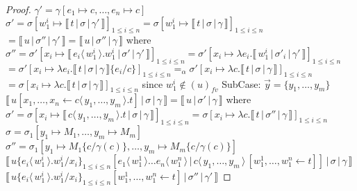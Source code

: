 \documentclass[a4paper,UKenglish,cleveref, autoref]{lipics-v2019}
\newcommand{\fv}[1]{(#1)_{fv}}
\newcommand{\set}[1]{ \{ #1 \} }
\newcommand{\abs}[2]{\lambda #1 . #2}
\newcommand{\fake}[3]{#1 \langle \, #2 \, \rangle . #3}
\newcommand{\share}[3]{#1 [#2 \leftarrow #3]}
\newcommand{\dist}[5]{#1 [ #2 \, \vert \, \fakedist{#4}{#5} \, #3 ]}
\newcommand{\fakedist}[2]{#1 \langle \, #2 \, \rangle}
\newcommand{\sub}[3]{#1 \{ #2 / #3 \}}
\newcommand{\readbackwmap}[3]{\llbracket \, #1 \, \vert \, #2 \, \vert \, #3  \, \rrbracket }
\begin{document}
\begin{proof}
$\gamma' = \gamma [e_{1}  \mapsto c, \dots, e_{n} \mapsto c]$
\newline
$\sigma' = \sigma [w^{i}_{1} \mapsto \readbackwmap{t}{\sigma}{\gamma'}]_{1 \leq i \leq n} = \sigma [w^{i}_{1} \mapsto \readbackwmap{t}{\sigma}{\gamma}]_{1 \leq i \leq n}$
\newline
$= \readbackwmap{u}{\sigma''}{\gamma'} = \readbackwmap{u}{\sigma''}{\gamma}$
\newline
where
\newline
$\sigma'' = \sigma' [x_{i} \mapsto \readbackwmap{\fake{e_{i}}{w^{i}_{1}}{w^{i}_{1}}}{\sigma'}{\gamma'}]_{1 \leq i \leq n} = \sigma' [x_{i} \mapsto \abs{e_{i}}{\readbackwmap{w^{i}_{1}}{\sigma'_{i}}{\gamma'}}]_{1 \leq i \leq n}$
\newline
\indent $= \sigma' [x_{i} \mapsto \abs{e_{i}}{\readbackwmap{t}{\sigma}{\gamma} \sub{}{e_{i}}{c}}]_{1 \leq i \leq n} =_{\alpha} \sigma' [x_{i} \mapsto \abs{c}{\readbackwmap{t}{\sigma}{\gamma}}]_{1 \leq i \leq n}$
\newline
\indent $=  \sigma [x_{i} \mapsto \abs{c}{\readbackwmap{t}{\sigma}{\gamma}}]_{1 \leq i \leq n}$ since $w^{i}_{1} \not\in \fv{u}$
\newline
\newline
SubCase: $\vec{y} = \set{y_{1}, \dots, y_{m}}$
\newline
$\readbackwmap{\share{u}{x_{1}, \dots, x_{n}}{\fake{c}{y_{1}, \dots, y_{m}}{t}}}{\sigma}{\gamma} = \readbackwmap{u}{\sigma'}{\gamma}$
\newline
where 
\newline
$\sigma' = \sigma [x_{i} \mapsto \readbackwmap{\fake{c}{y_{1}, \dots, y_{m}}{t}}{\sigma}{\gamma}]_{1 \leq i \leq n} = \sigma [x_{i} \mapsto \abs{c}{\readbackwmap{t}{\sigma''}{\gamma}}]_{1 \leq i \leq n}$
\newline
$\sigma = \sigma_{1} [y_{1} \mapsto M_{1} , \dots , y_{m} \mapsto M_{m} ]$
\newline
$\sigma'' = \sigma_{1}[ y_{1} \mapsto M_{1} \sub{}{c}{\gamma(c)} , \dots , y_{m} \mapsto M_{m} \sub{}{c}{\gamma(c)}]$
\newline
\newline
$\readbackwmap{\sub{u}{\fake{e_{i}}{w^{i}_{1}}{w^{i}_{1}}}{x_{i}}_{1 \leq i \leq n} \dist{}{\fakedist{e_{1}}{w^{1}_{1}} \dots \fakedist{e_{n}}{w^{n}_{1}}}{\share{}{w^{1}_{1}, \dots, w^{n}_{1}}{t}}{c}{y_{1}, \dots, y_{m}}}{\sigma}{\gamma}$
\newline
$\readbackwmap{\sub{u}{\fake{e_{i}}{w^{i}_{1}}{w^{i}_{1}}}{x_{i}}_{1 \leq i \leq n} \share{}{w^{1}_{1}, \dots, w^{n}_{1}}{t}}{\sigma''}{\gamma'}$

\end{proof}
\end{document}
